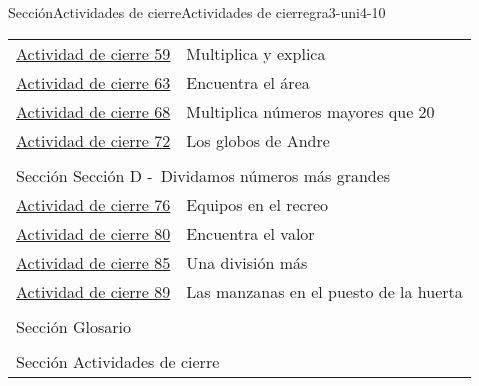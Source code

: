 \documentclass[twoside,10pt,]{article}
\begin{document}
\begin{sectionptx}{Sección}{Actividades de cierre}{}{Actividades de cierre}{}{}{gra3-uni4-10}
\begin{longtable}[l]{ll}
\hyperref[gra3-uni4-secC-lec14-cool-3]{Actividad de cierre 59}& Multiplica y explica\\
\hyperref[gra3-uni4-secC-lec15-cool-3]{Actividad de cierre 63}& Encuentra el área\\
\hyperref[gra3-uni4-secC-lec16-cool-3]{Actividad de cierre 68}& Multiplica números mayores que 20\\
\hyperref[gra3-uni4-secC-lec17-cool-3]{Actividad de cierre 72}& Los globos de Andre\\
\multicolumn{2}{l}{\null}\\[1.5ex] \multicolumn{2}{l}{\large Sección  Sección D -~Dividamos números más grandes}\\[0.5ex]
\hyperref[gra3-uni4-secD-lec18-cool-3]{Actividad de cierre 76}& Equipos en el recreo\\
\hyperref[gra3-uni4-secD-lec19-cool-3]{Actividad de cierre 80}& Encuentra el valor\\
\hyperref[gra3-uni4-secD-lec20-cool-3]{Actividad de cierre 85}& Una división más\\
\hyperref[gra3-uni4-secD-lec21-cool-3]{Actividad de cierre 89}& Las manzanas en el puesto de la huerta\\
\multicolumn{2}{l}{\null}\\[1.5ex] \multicolumn{2}{l}{\large Sección  Glosario}\\[0.5ex]
\multicolumn{2}{l}{\null}\\[1.5ex] \multicolumn{2}{l}{\large Sección  Actividades de cierre}\\[0.5ex]
\end{longtable}
\end{sectionptx}
\end{document}
